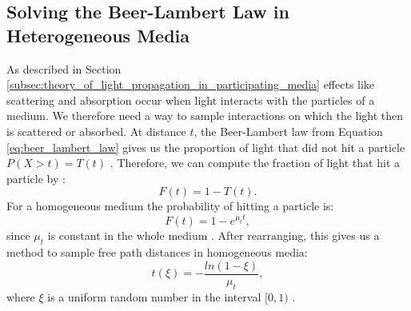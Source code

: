 \subsection{Solving the Beer-Lambert Law in Heterogeneous Media}
\label{subsec:solving_beer_lambert_law_in_heterogeneous_media}
As described in Section \ref{subsec:theory_of_light_propagation_in_participating_media} effects like scattering and absorption occur when light interacts with the particles of a medium.
We therefore need a way to sample interactions on which the light then is scattered or absorbed.
At distance $t$, the Beer-Lambert law from Equation \ref{eq:beer_lambert_law} gives us the proportion of light that did not hit a particle $P(X > t) = T(t)$ \cite{novak_overview}.
Therefore, we can compute the fraction of light that hit a particle by \cite{novak_overview}:
\begin{equation*}
    F(t) = 1 - T(t).
\end{equation*}
For a homogeneous medium the probability of hitting a particle is:
\begin{equation*}
    F(t) = 1 - e^{\mu_t t},
\end{equation*}
since $\mu_t$ is constant in the whole medium \cite{novak_overview}.
After rearranging, this gives us a method to sample free path distances in homogeneous media:
\begin{equation}
    \label{eq:distance_sampling}
    t(\xi) = -\frac{ln(1-\xi)}{\mu_t},
\end{equation}
where $\xi$ is a uniform random number in the interval $[0, 1)$ \cite{novak_overview}.


